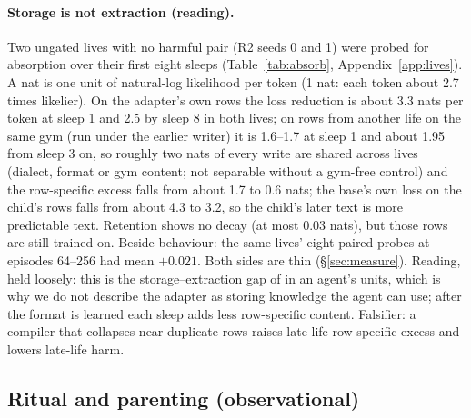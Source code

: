 \documentclass{article}
\begin{document}
\paragraph{Storage is not extraction (reading).} Two ungated lives with no harmful pair (R2 seeds 0 and 1) were probed for absorption over their first eight sleeps (Table~\ref{tab:absorb}, Appendix~\ref{app:lives}). A nat is one unit of natural-log likelihood per token (1 nat: each token about 2.7 times likelier). On the adapter's own rows the loss reduction is about 3.3 nats per token at sleep 1 and 2.5 by sleep 8 in both lives; on rows from another life on the same gym (run under the earlier writer) it is 1.6--1.7 at sleep 1 and about 1.95 from sleep 3 on, so roughly two nats of every write are shared across lives (dialect, format or gym content; not separable without a gym-free control) and the row-specific excess falls from about 1.7 to 0.6 nats; the base's own loss on the child's rows falls from about 4.3 to 3.2, so the child's later text is more predictable text. Retention shows no decay (at most 0.03 nats), but those rows are still trained on. Beside behaviour: the same lives' eight paired probes at episodes 64--256 had mean $+0.021$. Both sides are thin (\S\ref{sec:measure}). Reading, held loosely: this is the storage--extraction gap of \citet{allenzhu2023physics} in an agent's units, which is why we do not describe the adapter as storing knowledge the agent can use; after the format is learned each sleep adds less row-specific content. Falsifier: a compiler that collapses near-duplicate rows raises late-life row-specific excess and lowers late-life harm.

\subsection{Ritual and parenting (observational)}
\label{sec:parenting}
\end{document}
